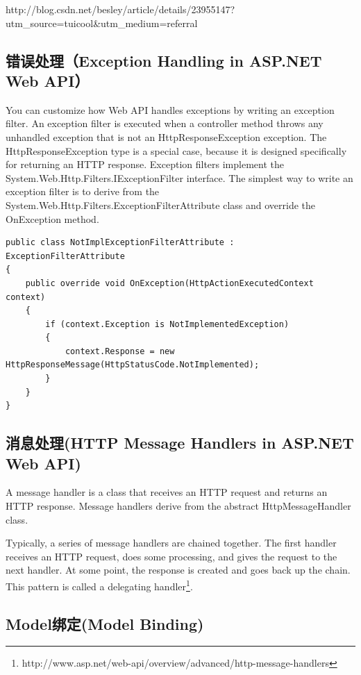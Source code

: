 \documentclass{book}
\begin{document}
http://blog.csdn.net/besley/article/details/23955147?utm\_source=tuicool\&utm\_medium=referral

\subsection{错误处理（Exception Handling in ASP.NET Web API）}

You can customize how Web API handles exceptions by writing an exception filter. 
An exception filter is executed when a controller method throws 
any unhandled exception that is not an HttpResponseException exception. 
The HttpResponseException type is a special case, 
because it is designed specifically for returning an HTTP response.
Exception filters implement the System.Web.Http.Filters.IExceptionFilter interface. 
The simplest way to write an exception filter is to derive from the System.Web.Http.Filters.ExceptionFilterAttribute class and override the OnException method.

\begin{lstlisting}[language={[Sharp]C},caption=Web API错误处理]
public class NotImplExceptionFilterAttribute : ExceptionFilterAttribute 
{
    public override void OnException(HttpActionExecutedContext context)
    {
        if (context.Exception is NotImplementedException)
        {
            context.Response = new HttpResponseMessage(HttpStatusCode.NotImplemented);
        }
    }
}
\end{lstlisting}

\subsection{消息处理(HTTP Message Handlers in ASP.NET Web API)}

A message handler is a class that receives an HTTP request 
and returns an HTTP response. Message handlers derive from the abstract HttpMessageHandler class.

Typically, a series of message handlers are chained together. 
The first handler receives an HTTP request, does some processing, 
and gives the request to the next handler. 
At some point, the response is created and goes back up the chain. 
This pattern is called a delegating handler\footnote{http://www.asp.net/web-api/overview/advanced/http-message-handlers}.

\subsection{Model绑定(Model Binding)}
\end{document}
